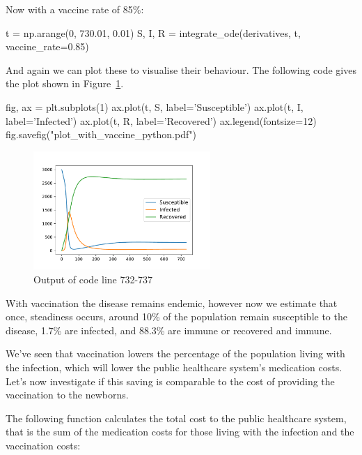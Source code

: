 Now with a vaccine rate of 85\%:

\begin{pyin}
t = np.arange(0, 730.01, 0.01)
S, I, R = integrate_ode(derivatives, t, vaccine_rate=0.85)
\end{pyin}

And again we can plot these to visualise their behaviour. The following code
gives the plot shown in Figure~\ref{fig:plot_with_vaccine}.

\begin{pyin-no-test}
fig, ax = plt.subplots(1)
ax.plot(t, S, label='Susceptible')
ax.plot(t, I, label='Infected')
ax.plot(t, R, label='Recovered')
ax.legend(fontsize=12)
fig.savefig("plot_with_vaccine_python.pdf")
\end{pyin-no-test}

\begin{figure}
\begin{center}
\includegraphics[width=0.6\textwidth]{./assets/plot_with_vaccine_python.pdf}
\end{center}
\caption{Output of code line 732-737}
\label{fig:plot_with_vaccine}
\end{figure}

With vaccination the disease remains endemic, however now we estimate that once,
steadiness occurs, around 10\% of the population remain susceptible to the
disease, 1.7\% are infected, and 88.3\% are immune or recovered and immune.

We've seen that vaccination lowers the percentage of the population living with
the infection, which will lower the public healthcare system's medication costs.
Let's now investigate if this saving is comparable to the cost of providing the
vaccination to the newborns.

The following function calculates the total cost to the public healthcare
system, that is the sum of the medication costs for those living with the
infection and the vaccination costs:

